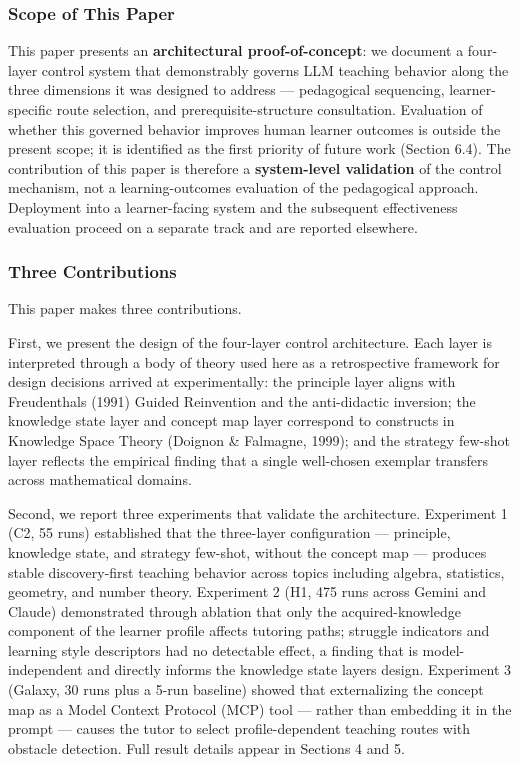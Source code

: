 \documentclass[
]{article}
\begin{document}
\subsubsection{Scope of This Paper}\label{scope-of-this-paper}

This paper presents an \textbf{architectural proof-of-concept}: we document a four-layer control system that demonstrably governs LLM teaching behavior along the three dimensions it was designed to address --- pedagogical sequencing, learner-specific route selection, and prerequisite-structure consultation. Evaluation of whether this governed behavior improves human learner outcomes is outside the present scope; it is identified as the first priority of future work (Section 6.4). The contribution of this paper is therefore a \textbf{system-level validation} of the control mechanism, not a learning-outcomes evaluation of the pedagogical approach. Deployment into a learner-facing system and the subsequent effectiveness evaluation proceed on a separate track and are reported elsewhere.

\subsubsection{Three Contributions}\label{three-contributions}

This paper makes three contributions.

First, we present the design of the four-layer control architecture. Each layer is interpreted through a body of theory used here as a retrospective framework for design decisions arrived at experimentally: the principle layer aligns with Freudenthal\textquotesingle s (1991) Guided Reinvention and the anti-didactic inversion; the knowledge state layer and concept map layer correspond to constructs in Knowledge Space Theory (Doignon \& Falmagne, 1999); and the strategy few-shot layer reflects the empirical finding that a single well-chosen exemplar transfers across mathematical domains.

Second, we report three experiments that validate the architecture. Experiment 1 (C2, 55 runs) established that the three-layer configuration --- principle, knowledge state, and strategy few-shot, without the concept map --- produces stable discovery-first teaching behavior across topics including algebra, statistics, geometry, and number theory. Experiment 2 (H1, 475 runs across Gemini and Claude) demonstrated through ablation that only the acquired-knowledge component of the learner profile affects tutoring paths; struggle indicators and learning style descriptors had no detectable effect, a finding that is model-independent and directly informs the knowledge state layer\textquotesingle s design. Experiment 3 (Galaxy, 30 runs plus a 5-run baseline) showed that externalizing the concept map as a Model Context Protocol (MCP) tool --- rather than embedding it in the prompt --- causes the tutor to select profile-dependent teaching routes with obstacle detection. Full result details appear in Sections 4 and 5.
\end{document}
